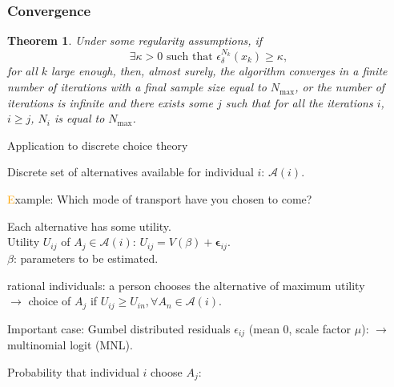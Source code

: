 \documentclass{beamer}
\newtheorem{theo}{Theorem}
\begin{document}
\begin{frame}
\frametitle{Convergence}

\begin{theo}
Under some regularity assumptions, if
\[
\exists \kappa > 0\text{ such that }
\epsilon_{\delta}^{N_k}(x_k) \geq \kappa,
\]
for all $k$ large enough, then, almost surely, the algorithm converges in a finite number of iterations with a final sample size equal to $N_{\max}$, or the number of iterations is infinite and there exists some $j$ such that for all the iterations $i$, $i \geq j$, $N_i$ is equal to $N_{\max}$.
\end{theo}

\end{frame}

\begin{frame}{Application to discrete choice theory}
		
			Discrete {\blue set of alternatives} available for individual $i$:
			$\mathcal{A}(i)$.
			
			\textcolor{orange}Example: Which mode of transport have you chosen to come?
			
			\vspace*{0.3cm}
			
			\begin{minipage}[c]{0.3\linewidth}
				\begin{center}
				\end{center}%
			\end{minipage}
			\begin{minipage}{0.68\linewidth}
				
				Each alternative has some utility.\\
				{\red Utility $U_{ij}$} of $A_j \in \mathcal{A}(i)$:
				$U_{i j} = V(\beta) + \boldsymbol{\epsilon}_{ij}.$\\
				$\beta$: parameters to be estimated.
				
				{\red rational individuals}: a person chooses
				the alternative of {\blue maximum utility}\\
				{\red $\rightarrow$} choice of $A_j$ if $U_{ij} \geq U_{in}, \forall A_n \in
				\mathcal{A}(i)$.
				
			\end{minipage}
			
				Important case: Gumbel distributed residuals $\epsilon_{ij}$ (mean 0,
				scale factor $\mu$):
				{\red $\rightarrow$ multinomial logit} (MNL).
				
				{\blue Probability} that individual $i$ choose $A_j$:
		
\end{frame}
\end{document}
